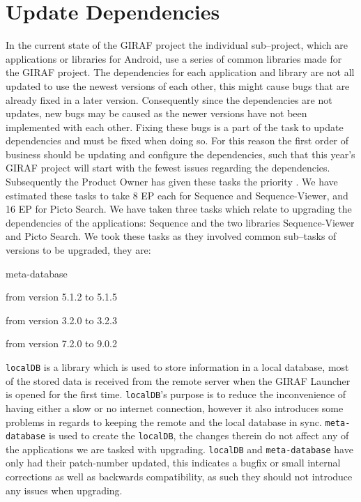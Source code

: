 \section{Update Dependencies}
In the current state of the GIRAF project the individual sub--project, which are applications or libraries for Android, use a series of common libraries made for the GIRAF project.
The dependencies for each application and library are not all updated to use the newest versions of each other, this might cause bugs that are already fixed in a later version.
Consequently since the dependencies are not updates, new bugs may be caused as the newer versions have not been implemented with each other.
Fixing these bugs is a part of the task to update dependencies and must be fixed when doing so.
For this reason the first order of business should be updating and configure the dependencies, such that this year's GIRAF project will start with the fewest issues regarding the dependencies.
Subsequently the Product Owner has given these tasks the priority \phigh.
We have estimated these tasks to take 8 EP each for Sequence and Sequence-Viewer, and 16 EP for Picto Search.
We have taken three tasks which relate to upgrading the dependencies of the applications: Sequence and the two libraries Sequence-Viewer and Picto Search.
We took these tasks as they involved common sub--tasks of versions to be upgraded, they are:
\begin{dankscription}{\ttfamily}{meta-database}
    \item[localDB] from version 5.1.2 to 5.1.5
    \item[meta-database] from version 3.2.0 to 3.2.3
    \item[oasisLib] from version 7.2.0 to 9.0.2
\end{dankscription}
\texttt{localDB} is a library which is used to store information in a local database, most of the stored data is received from the remote server when the GIRAF Launcher is opened for the first time.
\texttt{localDB}'s purpose is to reduce the inconvenience of having either a slow or no internet connection, however it also introduces some problems in regards to keeping the remote and the local database in sync.
\texttt{meta-database} is used to create the \texttt{localDB}, the changes therein do not affect any of the applications we are tasked with upgrading.
\texttt{localDB} and \texttt{meta-database} have only had their patch-number updated, this indicates a bugfix or small internal corrections as well as backwards compatibility, as such they should not introduce any issues when upgrading.

